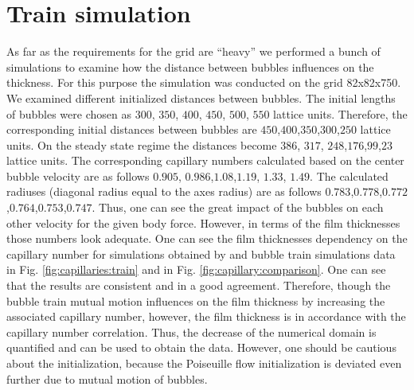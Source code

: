 \documentclass{article}
\begin{document}
\section{Train simulation}
\label{section:bubble:train}
As far as the requirements for the grid are ``heavy'' we performed a bunch of simulations to
examine how the distance between bubbles influences on the thickness. For this purpose the
simulation was conducted on the grid 82x82x750. We examined different initialized distances between
bubbles. The initial lengths of bubbles were chosen as $300$, $350$, $400$, $450$, $500$, $550$
lattice units. Therefore, the corresponding initial distances between bubbles are
$450$,$400$,$350$,$300$,$250$ lattice units. On the steady state regime the distances become $386$,
$317$, $248$,$176$,$99$,$23$ lattice units. The corresponding capillary numbers calculated based on
the center bubble velocity are as follows $0.905$, $0.986$,$1.08$,$1.19$, $1.33$, $1.49$. The
calculated radiuses (diagonal radius equal to the axes radius) are as follows
$0.783$,$0.778$,$0.772$,$0.764$,$0.753$,$0.747$. Thus, one can see the great impact of the bubbles
on each other velocity for the given body force. However, in terms of the film thicknesses those
numbers look adequate. One can see the film thicknesses dependency on the capillary number for
simulations obtained by \citet{heil-threedim} and bubble train simulations data in Fig.
\ref{fig:capillaries:train} and in Fig. \ref{fig:capillary:comparison}. One can see that the
results are consistent and in a good agreement.
Therefore, though the bubble train mutual motion influences on the film thickness by increasing the
associated capillary number,  however, the film thickness is in accordance with the capillary
number correlation. Thus, the decrease of the numerical domain is quantified and can be used to
obtain the data. However, one should be cautious about the initialization, because the Poiseuille
flow initialization is deviated even further due to mutual motion of bubbles.
\end{document}
